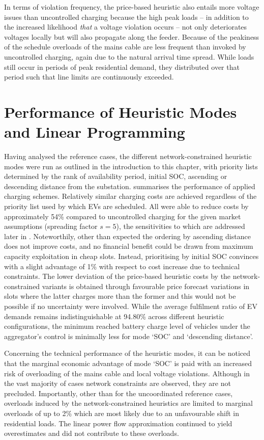 In terms of violation frequency, the price-based heuristic also entails more voltage issues than uncontrolled charging because the high peak loads -- in addition to the increased likelihood \textit{that} a voltage violation occurs -- not only deteriorates voltages locally but will also propagate along the feeder. Because of the peakiness of the schedule overloads of the mains cable are less frequent than invoked by uncontrolled charging, again due to the natural arrival time spread. While loads still occur in periods of peak residential demand, they distributed over that period such that line limits are continuously exceeded.

\section{Performance of Heuristic Modes and Linear Programming}
\label{sec:hmlp}

Having analysed the reference cases, the different network-constrained heuristic modes were run as outlined in the introduction to this chapter, with priority lists determined by the rank of availability period, initial SOC, ascending or descending distance from the substation.  summarises the performance of applied charging schemes. Relatively similar charging costs are achieved regardless of the priority list used by which EVs are scheduled. All were able to reduce costs by approximately 54\% compared to uncontrolled charging for the given market assumptions (spreading factor $s=5$), the sensitivities to which are addressed later in . Noteworthily, other than expected the ordering by ascending distance does not improve costs, and no financial benefit could be drawn from maximum capacity exploitation in cheap slots. Instead, prioritising by initial SOC convinces with a slight advantage of 1\% with respect to cost increase due to technical constraints. The lower deviation of the price-based heuristic costs by the network-constrained variants is obtained through favourable price forecast variations in slots where the latter charges more than the former and this would not be possible if no uncertainty were involved. While the average fulfilment ratio of EV demands remains indistinguishable at 94.80\% across different heuristic configurations, the minimum reached battery charge level of vehicles under the aggregator's control is minimally less for mode `SOC' and `descending distance'.

Concerning the technical performance of the heuristic modes, it can be noticed that the marginal economic advantage of mode `SOC' is paid with an increased risk of overloading of the mains cable and local voltage violations. Although in the vast majority of cases network constraints are observed, they are not precluded. Importantly, other than for the uncoordinated reference cases, overloads induced by the network-constrained heuristics are limited to marginal overloads of up to 2\% which are most likely due to an unfavourable shift in residential loads. The linear power flow approximation continued to yield overestimates and did not contribute to these overloads.

